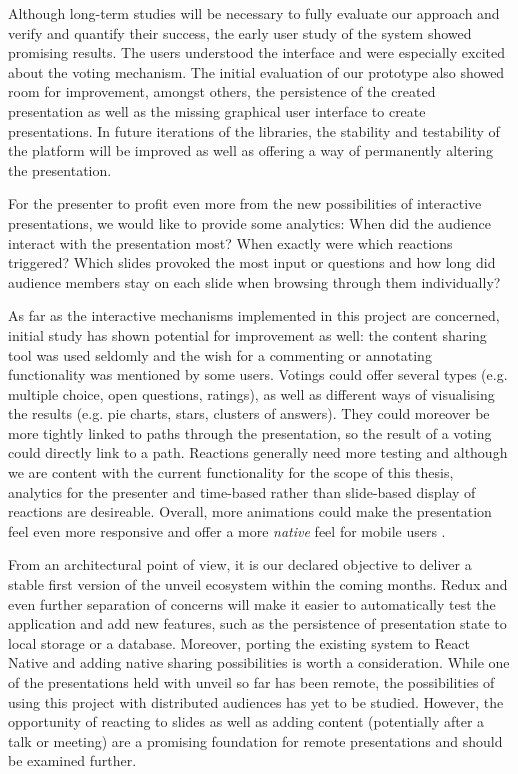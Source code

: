 Although long-term studies will be necessary to fully evaluate our approach and verify and quantify their success, the early user study of the system showed promising results. The users understood the interface and were especially excited about the voting mechanism. The initial evaluation of our prototype also showed room for improvement, amongst others, the persistence of the created presentation as well as the missing graphical user interface to create presentations. In future iterations of the libraries, the stability and testability of the platform will be improved as well as offering a way of permanently altering the presentation.

For the presenter to profit even more from the new possibilities of interactive presentations, we would like to provide some analytics: When did the audience interact with the presentation most? When exactly were which reactions triggered? Which slides provoked the most input or questions and how long did audience members stay on each slide when browsing through them individually?

As far as the interactive mechanisms implemented in this project are concerned, initial study has shown potential for improvement as well: the content sharing tool was used seldomly and the wish for a commenting or annotating functionality was mentioned by some users. Votings could offer several types (e.g. multiple choice, open questions, ratings), as well as different ways of visualising the results (e.g. pie charts, stars, clusters of answers). They could moreover be more tightly linked to paths through the presentation, so the result of a voting could directly link to a path.
Reactions generally need more testing and although we are content with the current functionality for the scope of this thesis, analytics for the presenter and time-based rather than slide-based display of reactions are desireable.
Overall, more animations could make the presentation feel even more responsive and offer a more \emph{native} feel for mobile users \cite{GoogleMaterialDesignGuide}.

From an architectural point of view, it is our declared objective to deliver a stable first version of the unveil ecosystem within the coming months. Redux and even further separation of concerns will make it easier to automatically test the application and add new features, such as the persistence of presentation state to local storage or a database. Moreover, porting the existing system to React Native and adding native sharing possibilities is worth a consideration.
While one of the presentations held with unveil so far has been remote, the possibilities of using this project with distributed audiences has yet to be studied. However, the opportunity of reacting to slides as well as adding content (potentially after a talk or meeting) are a promising foundation for remote presentations \cite{Isaacs:InteractivePresentationsDistributedAudience, Cheng:TreebasedOnlinePresentations} and should be examined further.

